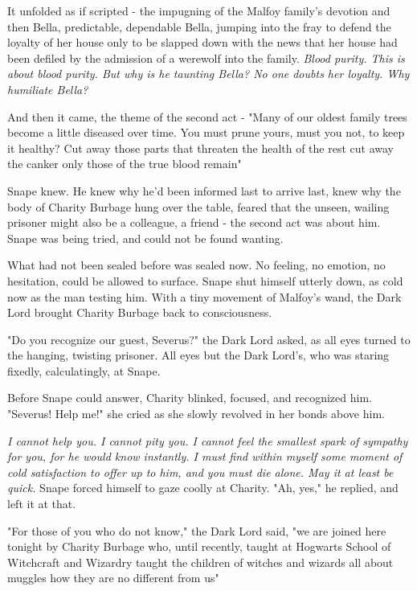 It unfolded as if scripted - the impugning of the Malfoy family's devotion and then Bella, predictable, dependable Bella, jumping into the fray to defend the loyalty of her house only to be slapped down with the news that her house had been defiled by the admission of a werewolf into the family. \emph{Blood purity. This is about blood purity. But why is he taunting Bella? No one doubts her loyalty. Why humiliate Bella?}

And then it came, the theme of the second act - "Many of our oldest family trees become a little diseased over time. You must prune yours, must you not, to keep it healthy? Cut away those parts that threaten the health of the rest{\el} cut away the canker{\el} only those of the true blood remain{\el}"

Snape knew. He knew why he'd been informed last to arrive last, knew why the body of Charity Burbage hung over the table, feared that the unseen, wailing prisoner might also be a colleague, a friend - the second act was about him. Snape was being tried, and could not be found wanting.

What had not been sealed before was sealed now. No feeling, no emotion, no hesitation, could be allowed to surface. Snape shut himself utterly down, as cold now as the man testing him. With a tiny movement of Malfoy's wand, the Dark Lord brought Charity Burbage back to consciousness.

"Do you recognize our guest, Severus?" the Dark Lord asked, as all eyes turned to the hanging, twisting prisoner. All eyes but the Dark Lord's, who was staring fixedly, calculatingly, at Snape.

Before Snape could answer, Charity blinked, focused, and recognized him. "Severus! Help me!" she cried as she slowly revolved in her bonds above him.

\emph{I cannot help you. I cannot pity you. I cannot feel the smallest spark of sympathy for you, for he would know instantly. I must find within myself some moment of cold satisfaction to offer up to him, and you must die alone. May it at least be quick.} Snape forced himself to gaze coolly at Charity. "Ah, yes," he replied, and left it at that.

"For those of you who do not know," the Dark Lord said, "we are joined here tonight by Charity Burbage who, until recently, taught at Hogwarts School of Witchcraft and Wizardry{\el} taught the children of witches and wizards all about muggles{\el} how they are no different from us{\el}"


